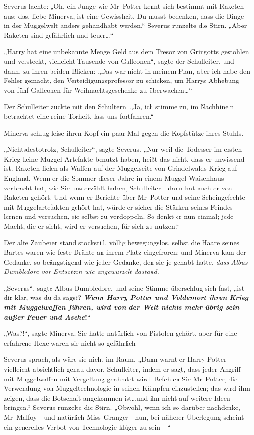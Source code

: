 {Severus lachte: „Oh, ein Junge wie Mr~Potter kennt sich bestimmt mit Raketen aus; das, liebe Minerva, ist eine Gewissheit. Du musst bedenken, dass die Dinge in der Muggelwelt anders gehandhabt werden.“ Severus runzelte die Stirn. „Aber Raketen sind gefährlich und teuer…“

„Harry hat eine unbekannte Menge Geld aus dem Tresor von Gringotts gestohlen und versteckt, vielleicht Tausende von Galleonen“, sagte der Schulleiter, und dann, zu ihren beiden Blicken: „Das war nicht in meinem Plan, aber ich habe den Fehler gemacht, den Verteidigungsprofessor zu schicken, um Harrys Abhebung von fünf Galleonen für Weihnachtsgeschenke zu überwachen…“

Der Schulleiter zuckte mit den Schultern. „Ja, ich stimme zu, im Nachhinein betrachtet eine reine Torheit, lass uns fortfahren.“

Minerva schlug leise ihren Kopf ein paar Mal gegen die Kopfstütze ihres Stuhls.

„Nichtsdestotrotz, Schulleiter“, sagte Severus. „Nur weil die Todesser im ersten Krieg keine Muggel-Artefakte benutzt haben, heißt das nicht, dass er unwissend ist. Raketen fielen als Waffen auf der Muggelseite von Grindelwalds Krieg auf England. Wenn er die Sommer dieser Jahre in einem Muggel-Waisenhaus verbracht hat, wie Sie uns erzählt haben, Schulleiter… dann hat auch er von Raketen gehört. Und wenn er Berichte über Mr~Potter und seine Scheingefechte mit Muggelartefakten gehört hat, würde er sicher die Stärken seines Feindes lernen und versuchen, sie selbst zu verdoppeln. So denkt er nun einmal; jede Macht, die er sieht, wird er versuchen, für sich zu nutzen.“

Der alte Zauberer stand stockstill, völlig bewegungslos, selbst die Haare seines Bartes waren wie feste Drähte an ihrem Platz eingefroren; und Minerva kam der Gedanke, so beängstigend wie jeder Gedanke, den sie je gehabt hatte, \emph{dass Albus Dumbledore vor Entsetzen wie angewurzelt dastand.}

„Severus“, sagte Albus Dumbledore, und seine Stimme überschlug sich fast, „ist dir klar, was du da sagst? \textbf{\emph{Wenn Harry Potter und Voldemort ihren Krieg mit Muggelwaffen führen, wird von der Welt nichts mehr übrig sein außer Feuer und Asche}!}“

„Was?!“, sagte Minerva. Sie hatte natürlich von Pistolen gehört, aber für eine erfahrene Hexe waren sie nicht so gefährlich—

Severus sprach, als wäre sie nicht im Raum. „Dann warnt er Harry Potter vielleicht absichtlich genau davor, Schulleiter, indem er sagt, dass jeder Angriff mit Muggelwaffen mit Vergeltung geahndet wird. Befehlen Sie Mr~Potter, die Verwendung von Muggeltechnologie in seinen Kämpfen einzustellen; das wird ihm zeigen, dass die Botschaft angekommen ist…und ihn nicht auf weitere Ideen bringen.“ Severus runzelte die Stirn. „Obwohl, wenn ich so darüber nachdenke, Mr~Malfoy - und natürlich Miss~Granger - nun, bei näherer Überlegung scheint ein generelles Verbot von Technologie klüger zu sein—“

}
